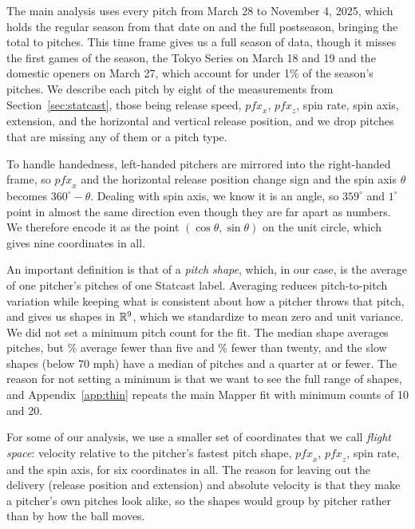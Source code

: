 \documentclass[11pt]{article}
\newcommand{\R}{\mathbb{R}}
\theoremstyle{definition}
\theoremstyle{remark}
\begin{document}
The main analysis uses every pitch from March 28 to November 4, 2025, which holds the regular season from that date on and the full postseason, bringing the total to \NPitches{} pitches.
This time frame gives us a full season of data, though it misses the first games of the season, the Tokyo Series on March 18 and 19 and the domestic openers on March 27, which account for under 1\% of the season's pitches.
We describe each pitch by eight of the measurements from Section~\ref{sec:statcast}, those being release speed, $\mathit{pfx}_x$, $\mathit{pfx}_z$, spin rate, spin axis, extension, and the horizontal and vertical release position, and we drop pitches that are missing any of them or a pitch type.

To handle handedness, left-handed pitchers are mirrored into the right-handed frame, so $\mathit{pfx}_x$ and the horizontal release position change sign and the spin axis $\theta$ becomes $360^\circ - \theta$.
Dealing with spin axis, we know it is an angle, so $359^\circ$ and $1^\circ$ point in almost the same direction even though they are far apart as numbers. We therefore encode it as the point $(\cos\theta, \sin\theta)$ on the unit circle, which gives nine coordinates in all.

An important definition is that of a \emph{pitch shape}, which, in our case, is the average of one pitcher's pitches of one Statcast label.
Averaging reduces pitch-to-pitch variation while keeping what is consistent about how a pitcher throws that pitch, and gives us \NShapes{} shapes in $\R^{\NFeatures}$, which we standardize to mean zero and unit variance.
We did not set a minimum pitch count for the fit. The median shape averages \MedianPitches{} pitches, but \PctLtFive\% average fewer than five and \PctLtTwenty\% fewer than twenty, and the \NSlow{} slow shapes (below 70 mph) have a median of \SlowMedian{} pitches and a quarter at \SlowQ{} or fewer.
The reason for not setting a minimum is that we want to see the full range of shapes, and Appendix~\ref{app:thin} repeats the main Mapper fit with minimum counts of 10 and 20.

For some of our analysis, we use a smaller set of coordinates that we call \emph{flight space}: velocity relative to the pitcher's fastest pitch shape, $\mathit{pfx}_x$, $\mathit{pfx}_z$, spin rate, and the spin axis, for six coordinates in all.
The reason for leaving out the delivery (release position and extension) and absolute velocity is that they make a pitcher's own pitches look alike, so the shapes would group by pitcher rather than by how the ball moves.
\end{document}
